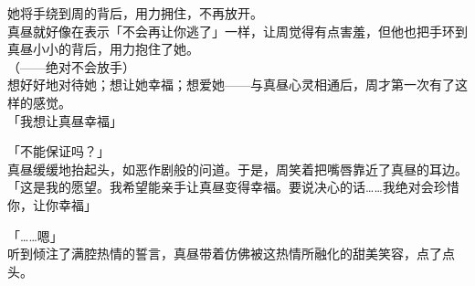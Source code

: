 她将手绕到周的背后，用力拥住，不再放开。\\

真昼就好像在表示「不会再让你逃了」一样，让周觉得有点害羞，但他也把手环到真昼小小的背后，用力抱住了她。\\

（——绝对不会放手）\\

想好好地对待她；想让她幸福；想爱她——与真昼心灵相通后，周才第一次有了这样的感觉。\\

「我想让真昼幸福」

「不能保证吗？」\\

真昼缓缓地抬起头，如恶作剧般的问道。于是，周笑着把嘴唇靠近了真昼的耳边。\\

「这是我的愿望。我希望能亲手让真昼变得幸福。要说决心的话……我绝对会珍惜你，让你幸福」

「……嗯」\\

听到倾注了满腔热情的誓言，真昼带着仿佛被这热情所融化的甜美笑容，点了点头。
